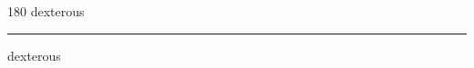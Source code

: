 
\begin{frame}
\begin{center}
\begin{turn}{180}
{\fontsize{2.5cm}{1em}\selectfont dexterous}
\end{turn}
\vspace{1em}\par  
\hrule
\vspace{1em}\par  
{\fontsize{2.5cm}{1em}\selectfont dexterous}
\end{center}
\end{frame}

